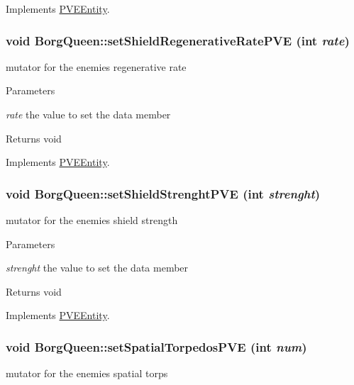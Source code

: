Implements \hyperlink{classPVEEntity}{PVEEntity}.

\hypertarget{classBorgQueen_adb0b4021391f1268f39c9ee5b9a0305b}{
\subsubsection[{setShieldRegenerativeRatePVE}]{\setlength{\rightskip}{0pt plus 5cm}void BorgQueen::setShieldRegenerativeRatePVE (int {\em rate})}}
\label{d6/d8d/classBorgQueen_adb0b4021391f1268f39c9ee5b9a0305b}
mutator for the enemies regenerative rate


\begin{DoxyParams}{Parameters}
\item[{\em rate}]the value to set the data member\end{DoxyParams}
\begin{DoxyReturn}{Returns}
void 
\end{DoxyReturn}


Implements \hyperlink{classPVEEntity}{PVEEntity}.

\hypertarget{classBorgQueen_a28ca84d583ef28a844f420188a575d74}{
\subsubsection[{setShieldStrenghtPVE}]{\setlength{\rightskip}{0pt plus 5cm}void BorgQueen::setShieldStrenghtPVE (int {\em strenght})}}
\label{d6/d8d/classBorgQueen_a28ca84d583ef28a844f420188a575d74}
mutator for the enemies shield strength


\begin{DoxyParams}{Parameters}
\item[{\em strenght}]the value to set the data member\end{DoxyParams}
\begin{DoxyReturn}{Returns}
void 
\end{DoxyReturn}


Implements \hyperlink{classPVEEntity}{PVEEntity}.

\hypertarget{classBorgQueen_a702e59cd2edc9823b54e9db4c7edf174}{
\subsubsection[{setSpatialTorpedosPVE}]{\setlength{\rightskip}{0pt plus 5cm}void BorgQueen::setSpatialTorpedosPVE (int {\em num})}}
\label{d6/d8d/classBorgQueen_a702e59cd2edc9823b54e9db4c7edf174}
mutator for the enemies spatial torps


